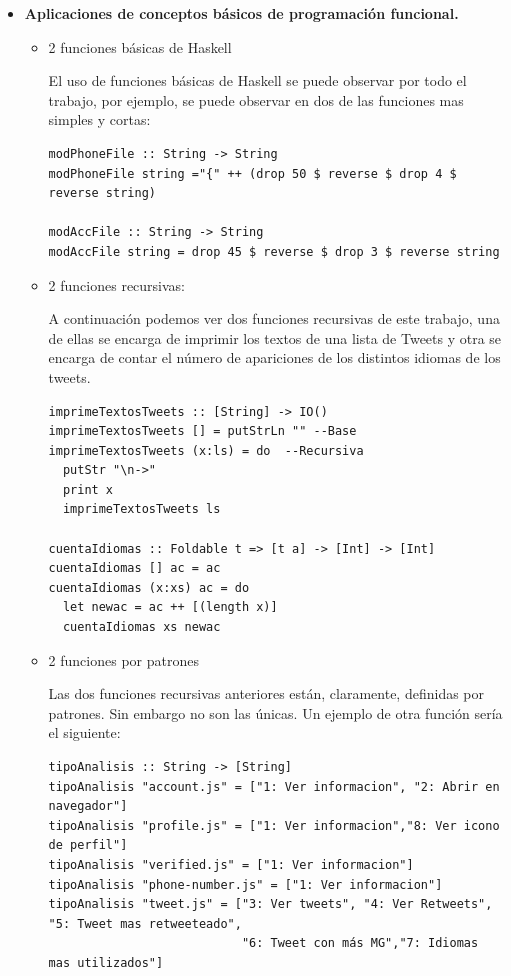 \documentclass[11pt]{article}
\begin{document}
\begin{itemize}
    \item \textbf{Aplicaciones de conceptos básicos de programación funcional.}
    \begin{itemize}
        \item 2 funciones básicas de Haskell
        
        El uso de funciones básicas de Haskell se puede observar por todo el trabajo, por ejemplo, se puede observar en dos de las funciones mas simples y cortas:
        \medskip
        \begin{verbatim}
modPhoneFile :: String -> String
modPhoneFile string ="{" ++ (drop 50 $ reverse $ drop 4 $ reverse string)

modAccFile :: String -> String
modAccFile string = drop 45 $ reverse $ drop 3 $ reverse string
        \end{verbatim}
        \medskip
        
        \item 2 funciones recursivas:
        
        A continuación podemos ver dos funciones recursivas de este trabajo, una de ellas se encarga de imprimir los textos de una lista de Tweets y otra se encarga de contar el número de apariciones de los distintos idiomas de los tweets.
        
        \begin{verbatim}
imprimeTextosTweets :: [String] -> IO()
imprimeTextosTweets [] = putStrLn "" --Base
imprimeTextosTweets (x:ls) = do  --Recursiva
  putStr "\n->"
  print x
  imprimeTextosTweets ls
  
cuentaIdiomas :: Foldable t => [t a] -> [Int] -> [Int]
cuentaIdiomas [] ac = ac
cuentaIdiomas (x:xs) ac = do
  let newac = ac ++ [(length x)]
  cuentaIdiomas xs newac
    \end{verbatim}
        \medskip
        \item 2 funciones por patrones
        
        Las dos funciones recursivas anteriores están, claramente, definidas por patrones. Sin embargo no son las únicas. Un ejemplo de otra función sería el siguiente:
        \begin{verbatim}
tipoAnalisis :: String -> [String]
tipoAnalisis "account.js" = ["1: Ver informacion", "2: Abrir en navegador"]
tipoAnalisis "profile.js" = ["1: Ver informacion","8: Ver icono de perfil"]
tipoAnalisis "verified.js" = ["1: Ver informacion"]
tipoAnalisis "phone-number.js" = ["1: Ver informacion"]
tipoAnalisis "tweet.js" = ["3: Ver tweets", "4: Ver Retweets", "5: Tweet mas retweeteado",
                           "6: Tweet con más MG","7: Idiomas mas utilizados"]
            \end{verbatim}


\end{itemize}
\end{itemize}
\end{document}
